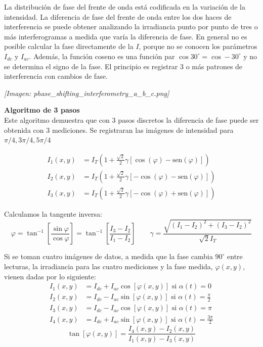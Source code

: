 \documentclass[12pt]{article}
\begin{document}
	La distribución de fase del frente de onda está codificada en la variación de la intensidad. La diferencia de fase del frente de onda entre los dos haces de interferencia se puede obtener analizando la irradiancia punto por punto de tres o más interferogramas a medida que varía la diferencia de fase.
	En general no es posible calcular la fase directamente de la $I$, porque no se conocen los parámetros $I_{dc}$ y $I_{ac}$. Además, la función coseno es una función par $\cos 30^\circ = \cos -30^\circ$ y no se determina el signo de la fase. El principio es registrar 3 o más patrones de interferencia con cambios de fase.
	
	\textit{[Imagen: phase\_shifting\_interferometry\_a\_b\_c.png]}
	
	\colorbox{green!20}{\textbf{Algoritmo de 3 pasos}} \\
	Este algoritmo demuestra que con 3 pasos discretos la diferencia de fase puede ser obtenida con 3 mediciones. Se registraran las imágenes de intensidad para $\pi/4, 3\pi/4, 5\pi/4$
	
	\begin{align*}
		I_1(x,y) &= I_T\left(1 + \frac{\sqrt{2}}{2}\gamma[\cos(\varphi) - \text{sen}(\varphi)]\right) \\
		I_2(x,y) &= I_T\left(1 + \frac{\sqrt{2}}{2}\gamma[-\cos(\varphi) - \text{sen}(\varphi)]\right) \\
		I_3(x,y) &= I_T\left(1 + \frac{\sqrt{2}}{2}\gamma[-\cos(\varphi) + \text{sen}(\varphi)]\right)
	\end{align*}
	
	Calculamos la tangente inversa:
	\begin{equation*}
		\varphi = \tan^{-1} \left[ \frac{\sin\varphi}{\cos\varphi} \right] = \tan^{-1} \left[ \frac{I_3 - I_2}{I_1 - I_2} \right] \qquad \gamma = \frac{\sqrt{(I_1 - I_2)^2 + (I_3 - I_2)^2}}{\sqrt{2}I_T}
	\end{equation*}
	
	\colorbox{green!20}{\parbox{\textwidth}{
			Si se toman cuatro imágenes de datos, a medida que la fase cambia $90^\circ$ entre lecturas, la irradiancia para las cuatro mediciones y la fase medida, $\varphi(x,y)$, vienen dadas por lo siguiente:
			\begin{align*}
				I_1(x,y) &= I_{dc} + I_{ac} \cos[\varphi(x,y)] \text{ si } \alpha(t) = 0 \\
				I_2(x,y) &= I_{dc} - I_{ac} \sin[\varphi(x,y)] \text{ si } \alpha(t) = \frac{\pi}{2} \\
				I_3(x,y) &= I_{dc} - I_{ac} \cos[\varphi(x,y)] \text{ si } \alpha(t) = \pi \\
				I_4(x,y) &= I_{dc} + I_{ac} \sin[\varphi(x,y)] \text{ si } \alpha(t) = \frac{3\pi}{2}
			\end{align*}
			\begin{equation*}
				\tan[\varphi(x,y)] = \frac{I_4(x,y) - I_2(x,y)}{I_1(x,y) - I_3(x,y)}
			\end{equation*}
	}}
	
\end{document}
